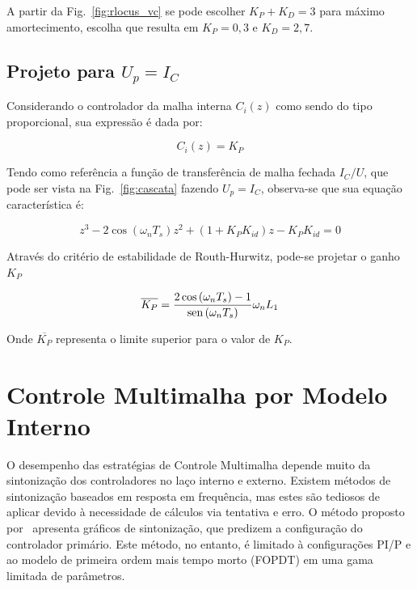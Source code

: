     A partir da Fig.~\ref{fig:rlocus_vc} se pode escolher $K_P+K_D = 3$ para máximo amortecimento,
    escolha que resulta em $K_P = 0,3$ e $K_D = 2,7$.


\subsection{Projeto para $U_p = I_C$}

    Considerando o controlador da malha interna $C_i(z)$ como sendo do tipo proporcional, sua
    expressão é dada por:

    \begin{equation}
        C_i(z) = K_P
    \end{equation}

    Tendo como referência a função de transferência de malha fechada $I_C/U$, que pode ser vista
    na Fig.~\ref{fig:cascata} fazendo $U_p = I_C$, observa-se que sua equação característica é:

    \begin{equation}
        z^3 - 2 \cos \left( \omega_n T_s \right) z^2 + \left( 1 + K_P K_{id} \right) z -
            K_P K_{id} = 0
    \end{equation}

    Através do critério de estabilidade de Routh-Hurwitz, pode-se projetar o ganho $K_P$

    \begin{equation}
        \overline{K_P} = \frac{2 \cos \left( \omega_n T_s \right) - 1}
            {\operatorname{sen} \left( \omega_n T_s \right)} \omega_n L_1
    \end{equation}

    Onde $\overline{K_P}$ representa o limite superior para o valor de $K_P$.


\section{Controle Multimalha por Modelo Interno}

    O desempenho das estratégias de Controle Multimalha depende muito da sintonização
    dos controladores no laço interno e externo. Existem métodos de sintonização
    baseados em resposta em frequência, mas estes são tediosos de aplicar devido
    à necessidade de cálculos via tentativa e erro. O método proposto
    por~\cite{ref:KRISHNA} apresenta gráficos de sintonização, que predizem a
    configuração do controlador primário. Este método, no entanto, é limitado
    à configurações PI/P e ao modelo de primeira ordem mais tempo morto (FOPDT)
    em uma gama limitada de parâmetros.

